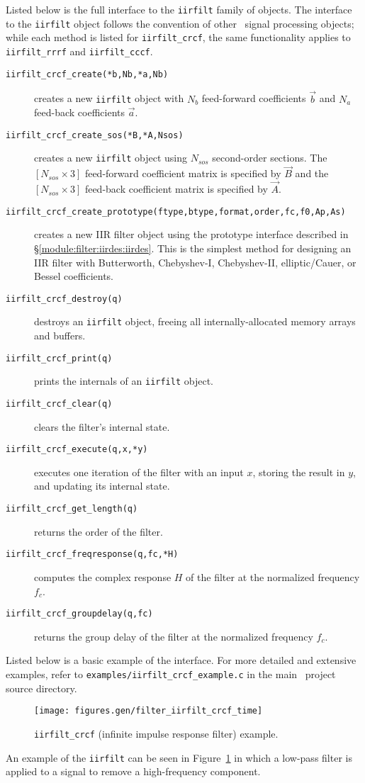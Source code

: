 Listed below is the full interface to the {\tt iirfilt} family of
objects.
The interface to the {\tt iirfilt} object follows the convention of
other \liquid\ signal processing objects;
while each method is listed for {\tt iirfilt\_crcf}, the same
functionality applies to {\tt iirfilt\_rrrf} and {\tt iirfilt\_cccf}.
%
\begin{description}
\item[{\tt iirfilt\_crcf\_create(*b,Nb,*a,Nb)}]
    creates a new {\tt iirfilt} object with
    $N_b$ feed-forward coefficients $\vec{b}$ and
    $N_a$ feed-back coefficients $\vec{a}$.
\item[{\tt iirfilt\_crcf\_create\_sos(*B,*A,Nsos)}]
    creates a new {\tt iirfilt} object using $N_{sos}$ second-order
    sections.
    The $[N_{sos} \times 3]$ feed-forward coefficient matrix is
    specified by $\vec{B}$ and
    the $[N_{sos} \times 3]$ feed-back coefficient matrix is
    specified by $\vec{A}$.
\item[{\tt iirfilt\_crcf\_create\_prototype(ftype,btype,format,order,fc,f0,Ap,As)}]
    creates a new IIR filter object using the prototype interface
    described in \S\ref{module:filter:iirdes:iirdes}.
    This is the simplest method for designing an IIR filter with
    Butterworth, Chebyshev-I, Chebyshev-II, elliptic/Cauer, or Bessel
    coefficients.
\item[{\tt iirfilt\_crcf\_destroy(q)}]
    destroys an {\tt iirfilt} object, freeing all internally-allocated memory
    arrays and buffers.
\item[{\tt iirfilt\_crcf\_print(q)}]
    prints the internals of an {\tt iirfilt} object.
\item[{\tt iirfilt\_crcf\_clear(q)}]
    clears the filter's internal state.
\item[{\tt iirfilt\_crcf\_execute(q,x,*y)}]
    executes one iteration of the filter with an input $x$, storing the
    result in $y$, and updating its internal state.
\item[{\tt iirfilt\_crcf\_get\_length(q)}]
    returns the order of the filter.
\item[{\tt iirfilt\_crcf\_freqresponse(q,fc,*H)}]
    computes the complex response $H$ of the filter at the normalized
    frequency $f_c$.
\item[{\tt iirfilt\_crcf\_groupdelay(q,fc)}]
    returns the group delay of the filter at the normalized
    frequency $f_c$.
\end{description}
%
Listed below is a basic example of the interface.
For more detailed and extensive examples, refer to
{\tt examples/iirfilt\_crcf\_example.c}
in the main \liquid\ project source directory.
%

%
\begin{figure}
\centering
  \texttt{[image: figures.gen/filter\_iirfilt\_crcf\_time]}
\caption{
    {\tt iirfilt\_crcf} (infinite impulse response filter)
    example.}
\label{fig:module:filter:iirfilt_crcf}
\end{figure}
%
An example of the {\tt iirfilt} can be seen in
Figure~\ref{fig:module:filter:iirfilt_crcf}
in which a low-pass filter is applied to a signal to remove a
high-frequency component.


